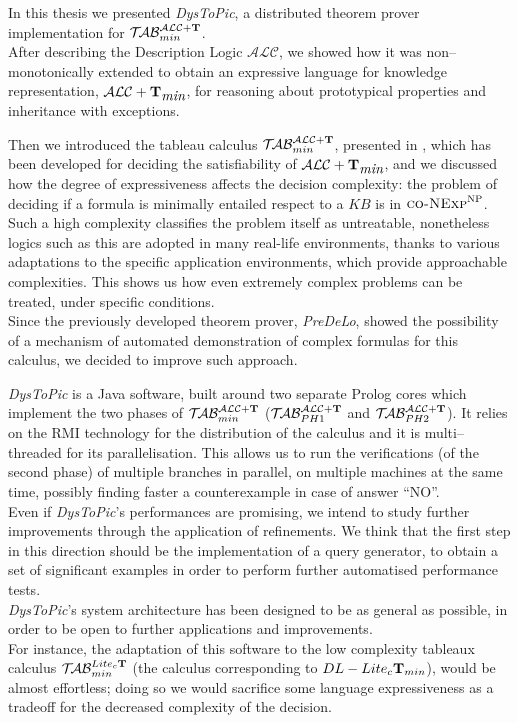 \documentclass[a4paper, 11pt, oneside]{duthesis}
\newcommand{\tip}{{\bf T}}
\newcommand{\alctmin}{\mathcal{ALC}+\tip_{\mbox{\em min}}}
\newcommand{\nuovoc}{\mathrel{{\mathcal{T}\!\mathcal{AB}}}_{min}^{\mathcal{ALC}+\mbox{\scriptsize $\tip$}}}
\newcommand{\primo}{\mathrel{{\mathcal{T}\!\mathcal{AB}}}_{PH 1}^{\mathcal{ALC}+\mbox{\scriptsize $\tip$}}}
\newcommand{\secondo}{\mathrel{{\mathcal{T}\!\mathcal{AB}}}_{PH 2}^{\mathcal{ALC}+\mbox{\scriptsize $\tip$}}}
\newcommand{\calclite}{\mathrel{{\mathcal{T}\!\mathcal{AB}}}_{min}^{Lite_c\mbox{\scriptsize $\tip$}}}
\begin{document}
In this thesis we presented \emph{DysToPic}, a distributed theorem prover implementation for $\nuovoc$.\\


After describing the Description Logic $\mathcal{ALC}$, we showed how it was non--monotonically extended to obtain an expressive language for knowledge representation, $\alctmin$, for reasoning about prototypical properties and inheritance with exceptions.

Then we introduced the tableau calculus $\nuovoc$, presented in \cite{Giordano:2013:NDL:2435476.2435957}, which has been developed for deciding the satisfiability of $\alctmin$, and we discussed how the degree of expressiveness affects the decision complexity: the problem of deciding if a formula is minimally entailed respect to a $KB$ is in $\textsc{co-NExp}^\textsc{NP}$.
Such a high complexity classifies the problem itself as untreatable, nonetheless logics such as this are adopted in many real-life environments, thanks to various adaptations to the specific application environments, which provide approachable complexities. This shows us how even extremely complex problems can be treated, under specific conditions.\\

Since the previously developed theorem prover, \emph{PreDeLo}, showed the possibility of a mechanism of automated demonstration of complex formulas for this calculus, we decided to improve such approach.

\emph{DysToPic} is a Java software, built around two separate Prolog cores which implement the two phases of $\nuovoc$ ($\primo$ and $\secondo$). It relies on the RMI technology for the distribution of the calculus and it is multi--threaded for its parallelisation. This allows us to run the verifications (of the second phase) of multiple branches in parallel, on multiple machines at the same time, possibly finding faster a counterexample in case of answer ``NO''.\\
Even if \emph{DysToPic}'s performances are promising, we intend to study further improvements through the application of refinements. We think that the first step in this direction should be the implementation of a query generator, to obtain a set of significant examples in order to perform further automatised performance tests.\\

\emph{DysToPic}'s system architecture has been designed to be as general as possible, in order to be open to further applications and improvements.\\
For instance, the adaptation of this software to the low complexity tableaux calculus $\calclite$ (the calculus corresponding to $DL-Lite_c\tip_{min}$), would be almost effortless; doing so we would sacrifice some language expressiveness as a tradeoff for the decreased complexity of the decision.
\end{document}
